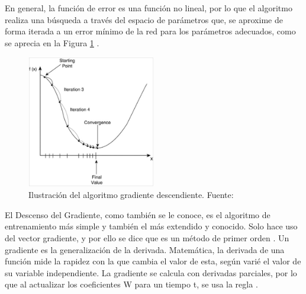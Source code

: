\begin{itemize}
\begin{itemize}
\begin{itemize}
			En general, la función de error es una función no lineal, por lo que el algoritmo realiza una búsqueda a través del espacio de parámetros que, se aproxime de forma iterada a un error mínimo de la red para los parámetros adecuados, como se aprecia en la Figura \ref{2:fig14} \parencite{tec_sancho2017descentgrad}.
			\begin{figure}[h]
				\begin{center}
					\includegraphics[width=0.5\textwidth]{2/figures/gradiente_descendiente.jpg}
					\caption{Ilustración del algoritmo gradiente descendiente. Fuente: \cite{tec_sancho2017descentgrad}}
					\label{2:fig14}
				\end{center}
			\end{figure}
			
			El Descenso del Gradiente, como también se le conoce, es el algoritmo de entrenamiento más simple y también el más extendido y conocido. Solo hace uso del vector gradiente, y por ello se dice que es un método de primer orden \parencite{tec_sancho2017descentgrad}. Un gradiente es la generalización de la derivada. Matemática, la derivada de una función mide la rapidez con la que cambia el valor de esta, según varié el valor de su variable independiente. La gradiente se calcula con derivadas parciales, por lo que al actualizar los coeficientes W para un tiempo t, se usa la regla \parencite{gl_iartificial2019descentgrad}.
			

\end{itemize}
\end{itemize}
\end{itemize}
